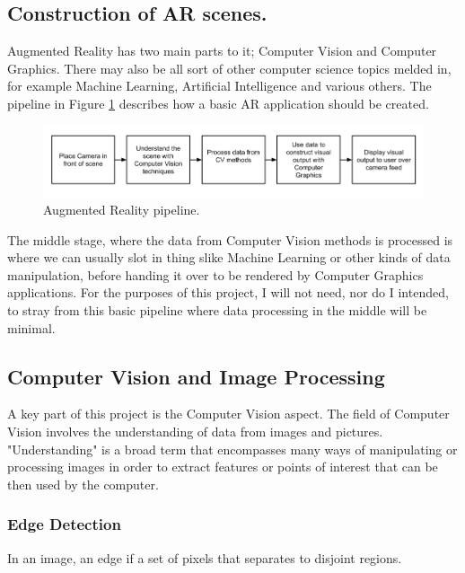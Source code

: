 \documentclass[11pt]{article}
\begin{document}
\subsection{Construction of AR scenes.}
Augmented Reality has two main parts to it; Computer Vision and Computer Graphics.
There may also be all sort of other computer science topics melded in, for
example Machine Learning, Artificial Intelligence and various others. 
The pipeline in Figure \ref{fig:arpipeline} describes how a basic AR 
application should be created.\\

\begin{figure} 
	\includegraphics[scale=0.5]{pics/ARpipeline}
	\caption{Augmented Reality pipeline.}
	\label{fig:arpipeline}
\end{figure}

The middle stage, where the data from Computer Vision methods is processed
is where we can usually slot in thing slike Machine Learning or other kinds
of data manipulation, before handing it over to be rendered by Computer
Graphics applications. For the purposes of this project, I will not need,
nor do I intended, to stray from this basic pipeline where data processing in 
the middle will be minimal.

\subsection{Computer Vision and Image Processing}
A key part of this project is the Computer Vision aspect. The field of
Computer Vision involves the understanding of data from images and pictures.
"Understanding" is a broad term that encompasses many ways of manipulating or
processing images in order to extract features or points of interest that
can be then used by the computer.

\subsubsection{Edge Detection}

\begin{center}
	In an image, an edge if a set of pixels that separates to disjoint
	regions.
\end{center}
\end{document}
